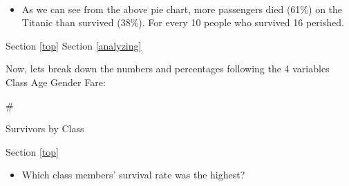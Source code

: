 \documentclass[11pt]{article}
\providecommand{\tightlist}{%
      \setlength{\itemsep}{0pt}\setlength{\parskip}{0pt}}
\begin{document}
    \begin{center}
    \end{center}
    { \hspace*{\fill} \\}
    
    \begin{itemize}
\tightlist
\item
  As we can see from the above pie chart, more passengers died (61\%) on
  the Titanic than survived (38\%). For every 10 people who survived 16
  perished.
\end{itemize}

    Section \ref{top} Section \ref{analyzing}

    Now, lets break down the numbers and percentages following the 4
variables Class \textbar{} Age \textbar{} Gender \textbar{} Fare:

     \#

Survivors by Class

Section \ref{top}

    \begin{itemize}
\tightlist
\item
  Which class members' survival rate was the highest?
\end{itemize}
\end{document}
